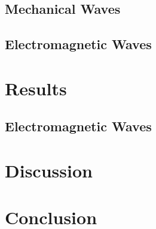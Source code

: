 \documentclass{article}
\begin{document}
\subsection{Mechanical Waves}
\label{ssec:ripple-method}


\subsection{Electromagnetic Waves}
\label{ssec:diffraction-method}


\section{Results}

\subsection{Electromagnetic Waves}
\label{ssec:diffraction-results}


\section{Discussion}
\label{sec:discussion}



\section{Conclusion}
\label{sec:conclusion}
\end{document}
